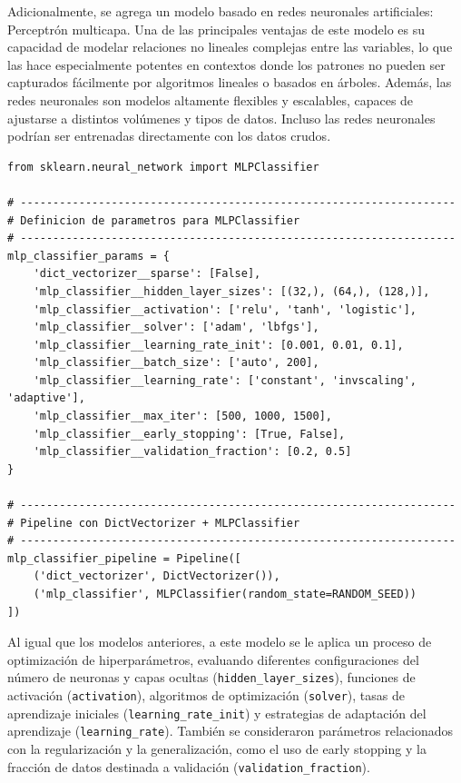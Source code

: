 \documentclass[11pt,a4paper,spanish]{book}
\numberwithin{equation}{chapter}
\numberwithin{figure}{chapter}
\begin{document}
Adicionalmente, se agrega un modelo basado en redes neuronales artificiales: Perceptrón multicapa. Una de las principales ventajas de este modelo es su capacidad de modelar relaciones no lineales complejas entre las variables, lo que las hace especialmente potentes en contextos donde los patrones no pueden ser capturados fácilmente por algoritmos lineales o basados en árboles. Además, las redes neuronales son modelos altamente flexibles y escalables, capaces de ajustarse a distintos volúmenes y tipos de datos. Incluso las redes neuronales podrían ser entrenadas directamente con los datos crudos. 


\vspace{5mm}
\begin{lstlisting}
from sklearn.neural_network import MLPClassifier

# -------------------------------------------------------------------
# Definicion de parametros para MLPClassifier
# -------------------------------------------------------------------
mlp_classifier_params = {
    'dict_vectorizer__sparse': [False],
    'mlp_classifier__hidden_layer_sizes': [(32,), (64,), (128,)],
    'mlp_classifier__activation': ['relu', 'tanh', 'logistic'],
    'mlp_classifier__solver': ['adam', 'lbfgs'],
    'mlp_classifier__learning_rate_init': [0.001, 0.01, 0.1],
    'mlp_classifier__batch_size': ['auto', 200],
    'mlp_classifier__learning_rate': ['constant', 'invscaling', 'adaptive'],
    'mlp_classifier__max_iter': [500, 1000, 1500],
    'mlp_classifier__early_stopping': [True, False],
    'mlp_classifier__validation_fraction': [0.2, 0.5]
}

# -------------------------------------------------------------------
# Pipeline con DictVectorizer + MLPClassifier
# -------------------------------------------------------------------
mlp_classifier_pipeline = Pipeline([
    ('dict_vectorizer', DictVectorizer()),
    ('mlp_classifier', MLPClassifier(random_state=RANDOM_SEED))
])
\end{lstlisting}

Al igual que los modelos anteriores, a este modelo se le aplica un proceso de optimización de hiperparámetros, evaluando diferentes configuraciones del número de neuronas y capas ocultas (\lstinline|hidden_layer_sizes|), funciones de activación (\lstinline|activation|), algoritmos de optimización (\lstinline|solver|), tasas de aprendizaje iniciales (\lstinline|learning_rate_init|) y estrategias de adaptación del aprendizaje (\lstinline|learning_rate|). También se consideraron parámetros relacionados con la regularización y la generalización, como el uso de early stopping y la fracción de datos destinada a validación (\lstinline|validation_fraction|). 
\end{document}
